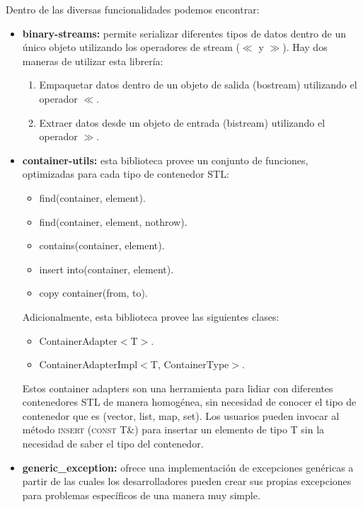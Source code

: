 \begin{itemize}
	\par Dentro de las diversas funcionalidades podemos encontrar:
	\begin{itemize}
		\item \textbf{binary-streams:} permite serializar diferentes tipos de datos dentro de un único objeto utilizando los
		 operadores de stream ($\ll$ y $\gg$). Hay dos maneras de utilizar esta librería:
			\begin{enumerate}
				\item Empaquetar datos dentro de un objeto de salida (bostream) utilizando el operador $\ll$.	
				\item Extraer datos desde un objeto de entrada (bistream) utilizando el operador $\gg$.
			\end{enumerate}
		\item \textbf{container-utils:} esta biblioteca provee un conjunto de funciones, optimizadas para cada tipo de 					contenedor STL:
				\begin{itemize}
					\item \textsf{find(container, element)}.
					\item \textsf{find(container, element, nothrow)}.
					\item \textsf{contains(container, element)}.
					\item \textsf{insert into(container, element)}.
					\item \textsf{copy container(from, to)}.
				\end{itemize}
				\par Adicionalmente, esta biblioteca provee las siguientes clases:
				\begin{itemize}
					\item \textsf{ContainerAdapter$<$T$>$}.
					\item \textsf{ContainerAdapterImpl$<$T, ContainerType$>$}.
				\end{itemize}
				\par Estos container adapters son una herramienta para lidiar con diferentes contenedores \textsc{STL} de manera 					homogénea, sin necesidad de conocer el tipo de contenedor que es (vector, list, map, set). Los usuarios pueden 					invocar al método \textsc{insert (const T\&)} para insertar un elemento de tipo \textsc{T} sin la necesidad de 					saber el tipo del contenedor.

		\item \textbf{generic\_exception:} ofrece una implementación de excepciones genéricas a partir de las cuales los 			desarrolladores pueden crear sus propias excepciones para problemas específicos de una manera muy simple.
	\end{itemize}
		

\end{itemize}
